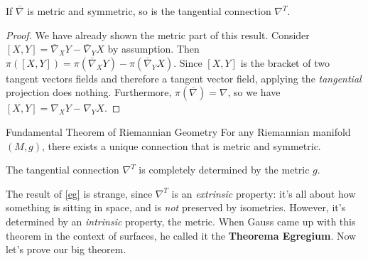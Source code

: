 \begin{theorem}\label{symm} 
    If $\overline{\nabla}$ is metric and symmetric, so is the tangential connection $\nabla^T$.
\end{theorem}
\begin{proof}
    We have already shown the metric part of this result. Consider $[X,Y]=\overline{\nabla}_XY -\overline{\nabla}_YX$ by assumption. Then $\pi([X,Y])=\pi(\overline{\nabla}_XY)-\pi(\overline{\nabla}_YX)$. Since $[X,Y]$ is the bracket of two tangent vectors fields and therefore a tangent vector field, applying the \emph{tangential} projection does nothing. Furthermore, $\pi(\overline{\nabla})=\nabla$, so we have $[X,Y]=\nabla_X Y-\nabla_YX$.
\end{proof}
\begin{namedthm}{Fundamental Theorem of Riemannian Geometry} 
    For any Riemannian manifold $(M,g)$, there exists a unique connection that is metric and symmetric. 
\end{namedthm}
\begin{cor}\label{eg} 
    The tangential connection $\nabla^T$ is completely determined by the metric $g$.
\end{cor}
The result of \cref{eg} is strange, since $\nabla^T$ is an \emph{extrinsic} property: it's all about how something is sitting in space, and is \emph{not} preserved by isometries. However, it's determined by an \emph{intrinsic} property, the metric. When Gauss came up with this theorem in the context of surfaces, he called it the \textbf{Theorema Egregium}. Now let's prove our big theorem.

